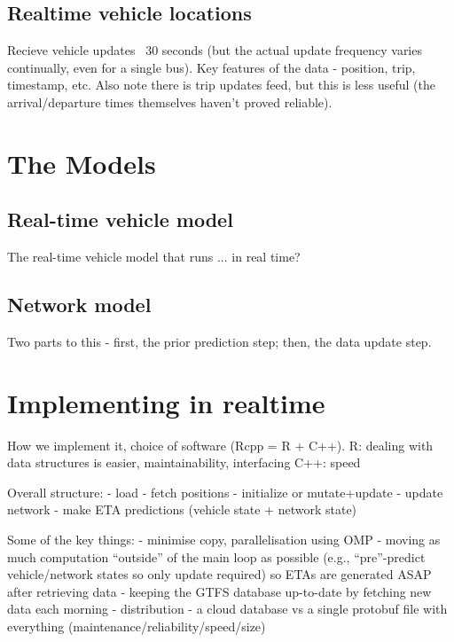 \documentclass[times, doublespace]{anzsauth}
\begin{document}
\subsection{Realtime vehicle locations}
\label{sec:realtime_data}

Recieve vehicle updates ~30 seconds (but the actual update frequency varies continually, even for a single bus).
Key features of the data - position, trip, timestamp, etc.
Also note there is trip updates feed, but this is less useful (the arrival/departure times themselves haven't proved reliable).



\section{The Models}
\label{sec:models}

\subsection{Real-time vehicle model}
\label{sec:pf}

The real-time vehicle model that runs ... in real time?


\subsection{Network model}
\label{sec:kf}

Two parts to this - first, the prior prediction step; then, the data update step.


\section{Implementing in realtime}
\label{sec:rt}

How we implement it, choice of software (Rcpp = R + C++).
R: dealing with data structures is easier, maintainability, interfacing
C++: speed

Overall structure:
- load
- fetch positions
- initialize or mutate+update
- update network
- make ETA predictions (vehicle state + network state)

Some of the key things:
- minimise copy, parallelisation using OMP
- moving as much computation ``outside'' of the main loop as possible
  (e.g., ``pre''-predict vehicle/network states so only update required)
  so ETAs are generated ASAP after retrieving data
- keeping the GTFS database up-to-date by fetching new data each morning
- distribution - a cloud database vs a single protobuf file with everything 
  (maintenance/reliability/speed/size)
\end{document}
